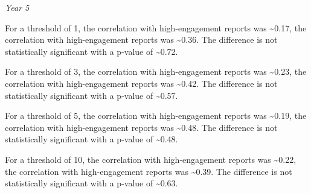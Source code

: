 \documentclass[
]{article}
\newenvironment{Shaded}{\begin{snugshade}}{\end{snugshade}}
\newcommand{\AttributeTok}[1]{\textcolor[rgb]{0.77,0.63,0.00}{#1}}
\newcommand{\FunctionTok}[1]{\textcolor[rgb]{0.00,0.00,0.00}{#1}}
\newcommand{\NormalTok}[1]{#1}
\newcommand{\OtherTok}[1]{\textcolor[rgb]{0.56,0.35,0.01}{#1}}
\newcommand{\SpecialCharTok}[1]{\textcolor[rgb]{0.00,0.00,0.00}{#1}}
\newcommand{\StringTok}[1]{\textcolor[rgb]{0.31,0.60,0.02}{#1}}
\begin{document}
\begin{Shaded}
\end{Shaded}

\emph{Year 5}

For a threshold of 1, the correlation with high-engagement reports was
\textasciitilde0.17, the correlation with high-engagement reports was
\textasciitilde0.36. The difference is not statistically significant
with a p-value of \textasciitilde0.72.

For a threshold of 3, the correlation with high-engagement reports was
\textasciitilde0.23, the correlation with high-engagement reports was
\textasciitilde0.42. The difference is not statistically significant
with a p-value of \textasciitilde0.57.

For a threshold of 5, the correlation with high-engagement reports was
\textasciitilde0.19, the correlation with high-engagement reports was
\textasciitilde0.48. The difference is not statistically significant
with a p-value of \textasciitilde0.48.

For a threshold of 10, the correlation with high-engagement reports was
\textasciitilde0.22, the correlation with high-engagement reports was
\textasciitilde0.39. The difference is not statistically significant
with a p-value of \textasciitilde0.63.
\end{document}
